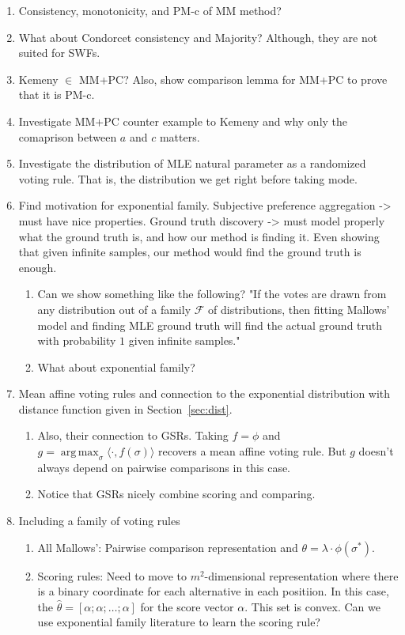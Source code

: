 \documentclass[10pt,letterpaper]{article}
\newcommand{\that}{\hat{\theta}}
\DeclareMathOperator*{\argmax}{arg\,max}
\begin{document}
\begin{enumerate}

\item Consistency, monotonicity, and PM-c of MM method?

\item What about Condorcet consistency and Majority? Although, they are not suited for SWFs.

\item Kemeny $\in$ MM+PC? Also, show comparison lemma for MM+PC to prove that it is PM-c.

\item Investigate MM+PC counter example to Kemeny and why only the comaprison between $a$ and $c$ matters. 

\item Investigate the distribution of MLE natural parameter as a randomized voting rule. That is, the distribution we get right before taking mode. 

\item Find motivation for exponential family. Subjective preference aggregation -> must have nice properties. Ground truth discovery -> must model properly what the ground truth is, and how our method is finding it. Even showing that given infinite samples, our method would find the ground truth is enough. 
\begin{enumerate}
\item Can we show something like the following? "If the votes are drawn from any distribution out of a family $\mathcal{F}$ of distributions, then fitting Mallows' model and finding MLE ground truth will find the actual ground truth with probability $1$ given infinite samples."
\item What about exponential family?
\end{enumerate}

\item Mean affine voting rules and connection to the exponential distribution with distance function given in Section~\ref{sec:dist}. 
\begin{enumerate}
\item Also, their connection to GSRs. Taking $f = \phi$ and $g = \argmax_{\sigma} \langle \cdot , f(\sigma) \rangle$ recovers a mean affine voting rule. But $g$ doesn't always depend on pairwise comparisons in this case. 
\item Notice that GSRs nicely combine scoring and comparing. 
\end{enumerate}

\item Including a family of voting rules
\begin{enumerate}
\item All Mallows': Pairwise comparison representation and $\theta = \lambda \cdot \phi(\sigma^*)$. 
\item Scoring rules: Need to move to $m^2$-dimensional representation where there is a binary coordinate for each alternative in each positiion. In this case, the $\that = [\alpha; \alpha ; \ldots ;\alpha]$ for the score vector $\alpha$. This set is convex. Can we use exponential family literature to learn the scoring rule?
\end{enumerate}


\end{enumerate}
\end{document}
